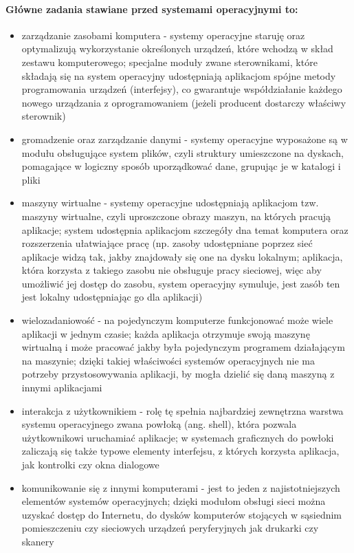 \documentclass[a4paper,twoside]{report}
\begin{document}
\paragraph{Główne zadania stawiane przed systemami operacyjnymi to:}
\begin{itemize}
\item zarządzanie zasobami komputera - systemy operacyjne staruję oraz optymalizują wykorzystanie określonych urządzeń, które wchodzą w skład zestawu komputerowego; specjalne moduły zwane sterownikami, które składają się na system operacyjny udostępniają aplikacjom spójne metody programowania urządzeń (interfejsy), co gwarantuje współdziałanie każdego nowego urządzania z oprogramowaniem (jeżeli producent dostarczy właściwy sterownik)
\item gromadzenie oraz zarządzanie danymi - systemy operacyjne wyposażone są w modułu obsługujące system plików, czyli struktury umieszczone na dyskach, pomagające w logiczny sposób uporządkować dane, grupując je w katalogi i pliki
\item maszyny wirtualne - systemy operacyjne udostępniają aplikacjom tzw. maszyny wirtualne, czyli uproszczone obrazy maszyn, na których pracują aplikacje; system udostępnia aplikacjom szczegóły dna temat komputera oraz rozszerzenia ułatwiające pracę (np. zasoby udostępniane poprzez sieć aplikacje widzą tak, jakby znajdowały się one na dysku lokalnym; aplikacja, która korzysta z takiego zasobu nie obsługuje pracy sieciowej, więc aby umożliwić jej dostęp do zasobu, system operacyjny symuluje, jest zasób ten jest lokalny udostępniając go dla aplikacji)
\item wielozadaniowość - na pojedynczym komputerze funkcjonować może wiele aplikacji w jednym czasie; każda aplikacja otrzymuje swoją maszynę wirtualną i może pracować jakby była pojedynczym programem działającym na maszynie; dzięki takiej właściwości systemów operacyjnych nie ma potrzeby przystosowywania aplikacji, by mogła dzielić się daną maszyną z innymi aplikacjami
\item interakcja z użytkownikiem - rolę tę spełnia najbardziej zewnętrzna warstwa systemu operacyjnego zwana powłoką (ang. shell), która pozwala użytkownikowi uruchamiać aplikacje; w systemach graficznych do powłoki zaliczają się także typowe elementy interfejsu, z których korzysta aplikacja, jak kontrolki czy okna dialogowe
\item komunikowanie się z innymi komputerami - jest to jeden z najistotniejszych elementów systemów operacyjnych; dzięki modułom obsługi sieci można uzyskać dostęp do Internetu, do dysków komputerów stojących w sąsiednim pomieszczeniu czy sieciowych urządzeń peryferyjnych jak drukarki czy skanery
\end{itemize}
\end{document}
